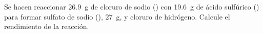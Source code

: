 Se hacen reaccionar \SI{26,9}{\gram} de cloruro de sodio () con \SI{19,6}{\gram} de ácido sulfúrico () para formar sulfato de sodio (), \SI{27}{\gram}, y cloruro de hidrógeno. Calcule el rendimiento de la reacción.
